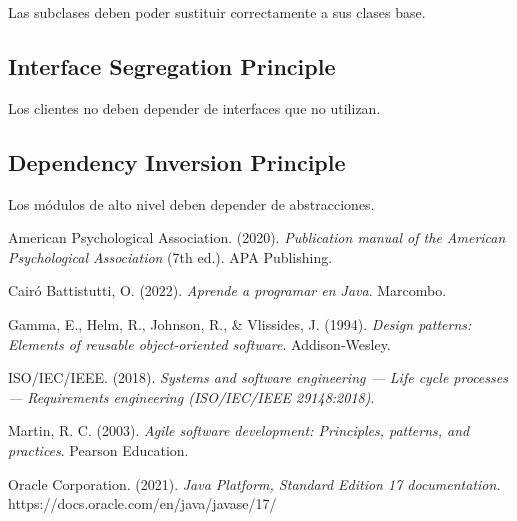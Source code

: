 \documentclass[stu,12pt,floatsintext]{apa7}
\begin{document}
Las subclases deben poder sustituir correctamente a sus clases base.

\subsection{Interface Segregation Principle}

Los clientes no deben depender de interfaces que no utilizan.

\subsection{Dependency Inversion Principle}

Los módulos de alto nivel deben depender de abstracciones.


\newpage

\begin{thebibliography}{}

American Psychological Association. (2020). \textit{Publication manual of the American Psychological Association} (7th ed.). APA Publishing.

Cairó Battistutti, O. (2022). \textit{Aprende a programar en Java}. Marcombo.

Gamma, E., Helm, R., Johnson, R., \& Vlissides, J. (1994). \textit{Design patterns: Elements of reusable object-oriented software}. Addison-Wesley.

ISO/IEC/IEEE. (2018). \textit{Systems and software engineering — Life cycle processes — Requirements engineering (ISO/IEC/IEEE 29148:2018)}.

Martin, R. C. (2003). \textit{Agile software development: Principles, patterns, and practices}. Pearson Education.

Oracle Corporation. (2021). \textit{Java Platform, Standard Edition 17 documentation}. https://docs.oracle.com/en/java/javase/17/

\end{thebibliography}
\end{document}
